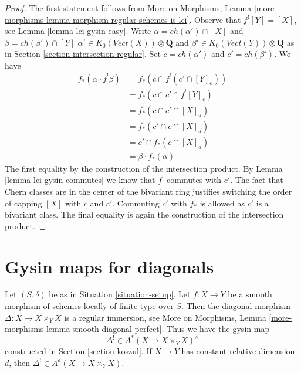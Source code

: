 \begin{proof}
The first statement follows from
More on Morphisms, Lemma
\ref{more-morphisms-lemma-morphism-regular-schemes-is-lci}.
Observe that $f^![Y] = [X]$, see Lemma \ref{lemma-lci-gysin-easy}.
Write $\alpha = ch(\alpha') \cap [X]$ and $\beta = ch(\beta') \cap [Y]$
$\alpha' \in K_0(\textit{Vect}(X)) \otimes \mathbf{Q}$ and
$\beta' \in K_0(\textit{Vect}(Y)) \otimes \mathbf{Q}$
as in Section \ref{section-intersection-regular}.
Set $c = ch(\alpha')$ and $c' = ch(\beta')$. We have
\begin{align*}
f_*(\alpha \cdot f^!\beta)
& =
f_*(c \cap f^!(c' \cap [Y]_e)) \\
& =
f_*(c \cap c' \cap f^![Y]_e) \\
& =
f_*(c \cap c' \cap [X]_d) \\
& =
f_*(c' \cap c \cap [X]_d) \\
& =
c' \cap f_*(c \cap [X]_d) \\
& =
\beta \cdot f_*(\alpha)
\end{align*}
The first equality by the construction of the intersection product.
By Lemma \ref{lemma-lci-gysin-commutes} we know that $f^!$
commutes with $c'$. The fact that Chern classes are in the center
of the bivariant ring justifies switching the order of capping
$[X]$ with $c$ and $c'$. Commuting $c'$ with $f_*$ is allowed as $c'$
is a bivariant class. The final equality is again the construction
of the intersection product.
\end{proof}













\section{Gysin maps for diagonals}
\label{section-gysin-for-diagonal}

\noindent
Let $(S, \delta)$ be as in Situation \ref{situation-setup}. Let $f : X \to Y$
be a smooth morphism of schemes locally of finite type over $S$. Then the
diagonal morphism $\Delta : X \longrightarrow X \times_Y X$
is a regular immersion, see
More on Morphisms, Lemma \ref{more-morphisms-lemma-smooth-diagonal-perfect}.
Thus we have the gysin map
$$
\Delta^! \in A^*(X \to X \times_Y X)^\wedge
$$
constructed in Section \ref{section-koszul}. If $X \to Y$ has constant
relative dimension $d$, then $\Delta^! \in A^d(X \to X \times_Y X)$.

